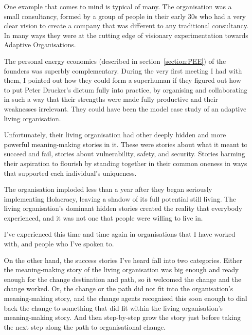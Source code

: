 \begin{longstoryblock}
One example that comes to mind is typical of many. The organisation was a small consultancy, formed by a group of people in their early 30s who had a very clear vision to create a company that was different to any traditional consultancy. In many ways they were at the cutting edge of visionary experimentation towards Adaptive Organisations.


The personal energy economics (described in section~\ref{section:PEE}) of the founders was superbly complementary. During the very first meeting I had with them, I pointed out how they could form a superhuman if they figured out how to put Peter Drucker's dictum fully into practice, by organising and collaborating in such a way that their strengths were made fully productive and their weaknesses irrelevant. They could have been the model case study of an adaptive living organisation.


Unfortunately, their living organisation had other deeply hidden and more powerful meaning\hyp{}making stories in it. These were stories about what it meant to succeed and fail, stories about vulnerability, safety, and security. Stories harming their aspiration to flourish by standing together in their common oneness in ways that supported each individual's uniqueness. 


The organisation imploded less than a year after they began seriously implementing Holacracy, leaving a shadow of its full potential still living. The living organisation’s dominant hidden stories created the reality that everybody experienced, and it was not one that people were willing to live in.
\end{longstoryblock}


I've experienced this time and time again in organisations that I have worked with, and people who I've spoken to. 


On the other hand, the success stories I've heard fall into two categories. Either the meaning\hyp{}making story of the living organisation was big enough and ready enough for the change destination and path, so it welcomed the change and the change worked. Or, the change or the path did not fit into the organisation's meaning\hyp{}making story, and the change agents recognised this soon enough to dial back the change to something that did fit within the living organisation's meaning\hyp{}making story. And then step-by-step grow the story just before taking the next step along the path to organisational change. 
